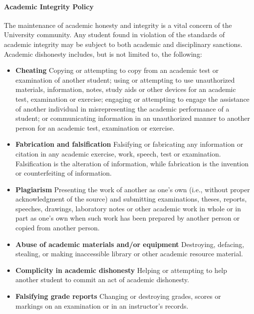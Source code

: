 \documentclass[12pt]{article}
\newcounter{ex}\setcounter{ex}{0}
\begin{document}
\paragraph{Academic Integrity Policy}

The maintenance of academic honesty and integrity is a vital concern 
of the University community. Any student found in violation of the 
standards of academic integrity may be subject to both academic and 
disciplinary sanctions. Academic dishonesty includes, but is not 
limited to, the following:

\begin{itemize}
    \item \textbf{Cheating} Copying or attempting to copy from an academic 
    test or examination of another student; using or attempting to 
    use unauthorized materials, information, notes, study aids or 
    other devices for an academic test, examination or exercise; 
    engaging or attempting to engage the assistance of another 
    individual in misrepresenting the academic performance of a 
    student; or communicating information in an unauthorized manner 
    to another person for an academic test, examination or exercise.
    
    \item \textbf{Fabrication and falsification} Falsifying or 
    fabricating any information or citation in any academic exercise, 
    work, speech, test or examination. Falsification is the 
    alteration of information, while fabrication is the invention 
    or counterfeiting of information.

    \item \textbf{Plagiarism}  Presenting the work of another as one's 
    own (i.e., without proper acknowledgment of the source) and 
    submitting examinations, theses, reports, speeches, drawings, 
    laboratory notes or other academic work in whole or in part as 
    one's own when such work has been prepared by another person or 
    copied from another person.

    \item \textbf{Abuse of academic materials and/or equipment} 
    Destroying, defacing, stealing, or making inaccessible library 
    or other academic resource material.

    \item \textbf{Complicity in academic dishonesty} Helping or 
    attempting to help another student to commit an act of academic 
    dishonesty.

    \item \textbf{Falsifying grade reports} Changing or destroying 
    grades, scores or markings on an examination or in an 
    instructor's records.


\end{itemize}
\end{document}
